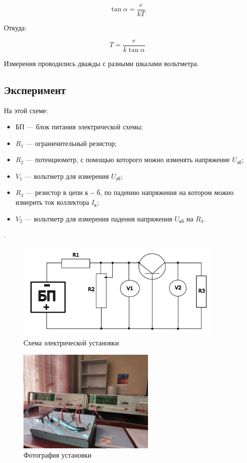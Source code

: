 \[
\tan \alpha = \frac{e}{kT}
\]

Откуда:

\[
T = \frac{e}{k \tan \alpha}
\]

Измерения проводились дважды с разными шкалами вольтметра.


\subsection{Эксперимент}
На этой схеме:
\begin{itemize}
    \item БП — блок питания электрической схемы;
    \item \( R_1 \) — ограничительный резистор;
    \item \( R_2 \) — потенциометр, с помощью которого можно изменять напряжение \( U_{\text{эб}} \);
    \item \( V_1 \) — вольтметр для измерения \( U_{\text{эб}} \);
    \item \( R_3 \) — резистор в цепи \( к-б \), по падению напряжения на котором можно измерить ток коллектора \( I_{\text{к}} \);
    \item \( V_2 \) — вольтметр для измерения падения напряжения \( U_{\text{кб}} \) на \( R_3 \).
\end{itemize}.

\begin{figure}[ht!]
\centering
\includegraphics[width=0.9\textwidth]{Схема электрической.pdf}
\caption{Схема электрической установки}
\label{fig:sketch}
\end{figure}

\begin{figure}[H]
\centering
\includegraphics[width=0.6\textwidth]{Установка.jpg}
\caption{Фотография установки}
\label{fig:device}
\end{figure}


